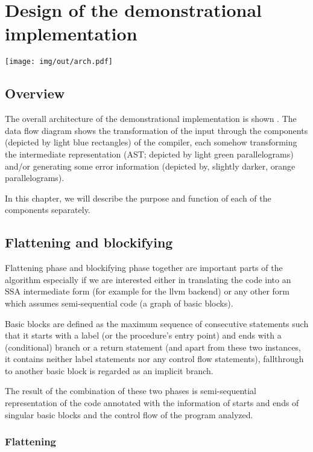 

\chapter{Design of the demonstrational implementation}
\label{chap3}

\texttt{[image: img/out/arch.pdf]}

\section{Overview}

The overall architecture of the demonstrational implementation is shown . The data flow diagram shows the transformation of the input through the components (depicted by light blue rectangles) of the compiler, each somehow transforming the intermediate representation (AST; depicted by light green parallelograms) and/or generating some error information (depicted by, slightly darker, orange parallelograms).

In this chapter, we will describe the purpose and function of each of the components separately.

\section{Flattening and blockifying}

Flattening phase and blockifying phase together are important parts of the algorithm especially if we are interested either in translating the code into an SSA intermediate form (for example for the llvm backend) or any other form which assumes semi-sequential code (a graph of basic blocks).

Basic blocks are defined as the maximum sequence of consecutive statements such that it starts with a label (or the procedure's entry point) and ends with a (conditional) branch or a return statement (and apart from these two instances, it contains neither label statements nor any control flow statements), fallthrough to another basic block is regarded as an implicit branch.

The result of the combination of these two phases is semi-sequential representation of the code annotated with the information of starts and ends of singular basic blocks and the control flow of the program analyzed.

\subsection{Flattening}

